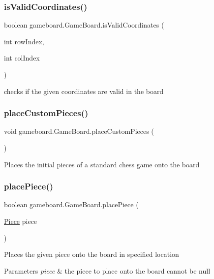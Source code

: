 \subsubsection{\texorpdfstring{is\+Valid\+Coordinates()}{isValidCoordinates()}}
{\footnotesize\ttfamily boolean gameboard.\+Game\+Board.\+is\+Valid\+Coordinates (\begin{DoxyParamCaption}\item[{int}]{row\+Index,  }\item[{int}]{col\+Index }\end{DoxyParamCaption})}

checks if the given coordinates are valid in the board \mbox{\label{classgameboard_1_1_game_board_ae7f2394074cc527b4ed933d562f08f06}} 
\subsubsection{\texorpdfstring{place\+Custom\+Pieces()}{placeCustomPieces()}}
{\footnotesize\ttfamily void gameboard.\+Game\+Board.\+place\+Custom\+Pieces (\begin{DoxyParamCaption}{ }\end{DoxyParamCaption})}

Places the initial pieces of a standard chess game onto the board \mbox{\label{classgameboard_1_1_game_board_aee63d4310ef2ea7cb177013eed310b40}} 
\subsubsection{\texorpdfstring{place\+Piece()}{placePiece()}}
{\footnotesize\ttfamily boolean gameboard.\+Game\+Board.\+place\+Piece (\begin{DoxyParamCaption}\item[{\mbox{\hyperlink{classpieces_1_1_piece}{Piece}}}]{piece }\end{DoxyParamCaption})}

Places the given piece onto the board in specified location 
\begin{DoxyParams}{Parameters}
{\em piece} & the piece to place onto the board cannot be null \\
\hline
\end{DoxyParams}
\mbox{\label{classgameboard_1_1_game_board_a6e74eee1e3ec913341e6f440064d0f80}} 
